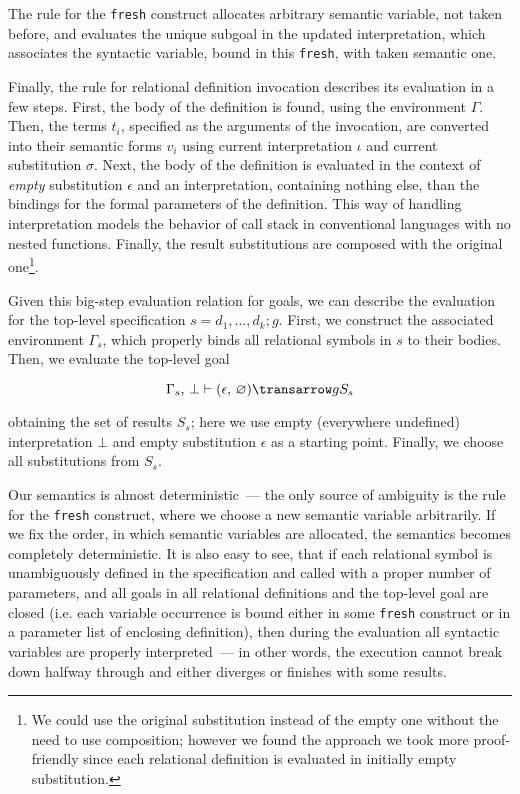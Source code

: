 The rule for the \lstinline|fresh| construct allocates arbitrary semantic variable, not taken before, and evaluates the unique subgoal in the updated interpretation, which
associates the syntactic variable, bound in this \lstinline|fresh|, with taken semantic one.

Finally, the rule for relational definition invocation describes its evaluation in a few steps. First, the body of the definition is found, using the environment $\Gamma$. 
Then, the terms $t_i$, specified as the arguments of the invocation, are converted into their semantic forms $v_i$ using current interpretation $\iota$ and current 
substitution $\sigma$. Next, the body of the definition is evaluated in the context of \emph{empty} substitution $\epsilon$ and an interpretation, containing nothing
else, than the bindings for the formal parameters of the definition. This way of handling interpretation models the behavior of call stack in conventional languages
with no nested functions. Finally, the result substitutions are composed with the original one\footnote{We could use the original
substitution instead of the empty one without the need to use composition; however we found the approach we took more proof-friendly since each relational definition is evaluated
in initially empty substitution.}. 

Given this big-step evaluation relation for goals, we can describe the evaluation for the top-level specification $s=d_1,\dots,d_k;g$. First, we construct the associated environment
$\Gamma_s$, which properly binds all relational symbols in $s$ to their bodies. Then, we evaluate the top-level goal

$$
\otrans{\Gamma_s,\,\bot}{(\epsilon,\,\emptyset)}{g}{S_s}
$$

\noindent obtaining the set of results $S_s$; here we use empty (everywhere undefined) interpretation $\bot$ and empty substitution $\epsilon$ as a starting point. 
Finally, we choose all substitutions from $S_s$. 

Our semantics is almost deterministic~--- the only source of ambiguity is the rule for the \lstinline|fresh| construct, where we choose a new semantic variable
arbitrarily. If we fix the order, in which semantic variables are allocated, the semantics becomes completely deterministic. It is also easy to see, that if each
relational symbol is unambiguously defined in the specification and called with a proper number of parameters, and all goals in all relational definitions and the 
top-level goal are closed (i.e. each variable occurrence is bound either in some \lstinline|fresh| construct or in a parameter list of enclosing definition), 
then during the evaluation all syntactic variables are properly interpreted~--- in other words, the execution cannot break down halfway through and either diverges or 
finishes with some results.

